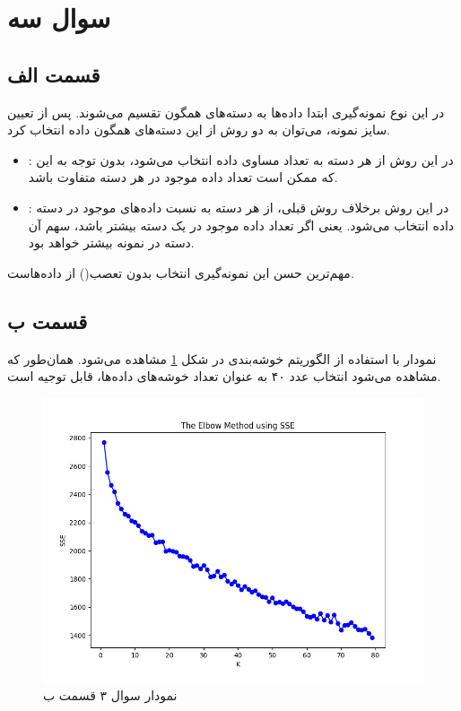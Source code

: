 \documentclass[12pt, a4paper]{article}
\begin{document}
\clearpage

\section*{سوال سه}

\subsection*{قسمت الف}

در این نوع نمونه‌گیری ابتدا داده‌ها به دسته‌های همگون تقسیم می‌شوند. پس از تعیین سایز نمونه،
می‌توان به دو روش از این دسته‌های همگون داده انتخاب کرد.

\begin{itemize}
    \item {}: در این روش از هر دسته به تعداد مساوی داده انتخاب می‌شود،
    بدون توجه به این که ممکن است تعداد داده موجود در هر دسته متفاوت باشد.
    \item {}: در این روش برخلاف روش قبلی، از هر دسته به نسبت داده‌های موجود در دسته
    داده انتخاب می‌شود. یعنی اگر تعداد داده موجود در یک دسته بیشتر باشد، سهم آن دسته در نمونه بیشتر خواهد بود.
\end{itemize}

مهم‌ترین حسن این نمونه‌گیری انتخاب بدون تعصب() از داده‌هاست.

\subsection*{قسمت ب}

نمودار  با استفاده از الگوریتم خوشه‌بندی  در شکل \ref{elbow} مشاهده می‌شود.
همان‌طور که مشاهده می‌شود انتخاب عدد ۴۰ به عنوان تعداد خوشه‌های داده‌ها، قابل توجیه است.

\begin{figure}[h]
    \centering
    \includegraphics[width=0.8\linewidth]{images/q3/b/elbow.png}
    \caption{نمودار  سوال ۳ قسمت ب}
    \label{elbow}
\end{figure}
\end{document}
